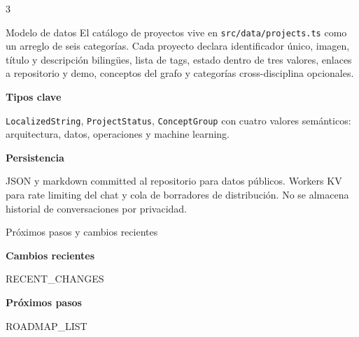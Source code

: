 \documentclass[10pt]{article}
\newcommand{\posterheading}[1]{%
  \vspace{4pt}%
  \par{\color{accentdark}\sffamily\bfseries #1}\par
  \vspace{2pt}%
}
\begin{document}
\begin{multicols}{3}
\begin{posterblock}{Modelo de datos}
El catálogo de proyectos vive en \texttt{src/data/projects.ts} como un arreglo de seis categorías. Cada proyecto declara identificador único, imagen, título y descripción bilingües, lista de tags, estado dentro de tres valores, enlaces a repositorio y demo, conceptos del grafo y categorías cross-disciplina opcionales.

\posterheading{Tipos clave}
\texttt{LocalizedString}, \texttt{ProjectStatus}, \texttt{ConceptGroup} con cuatro valores semánticos: arquitectura, datos, operaciones y machine learning.

\posterheading{Persistencia}
JSON y markdown committed al repositorio para datos públicos. Workers KV para rate limiting del chat y cola de borradores de distribución. No se almacena historial de conversaciones por privacidad.
\end{posterblock}

\begin{posterblock}{Próximos pasos y cambios recientes}
\posterheading{Cambios recientes}
{{RECENT_CHANGES}}

\posterheading{Próximos pasos}
{{ROADMAP_LIST}}
\end{posterblock}

\end{multicols}
\end{document}
